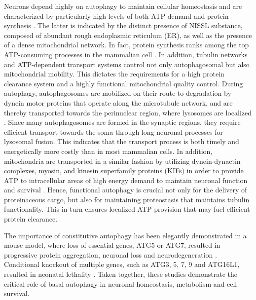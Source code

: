 Neurons depend highly on autophagy to maintain cellular homeostasis and are characterized by particularly high levels of both ATP demand and protein synthesis \citep{Meijer2009,Son2012}. The latter is indicated by the distinct presence of NISSL substance, composed of abundant rough endoplasmic reticulum (ER), as well as the presence of a dense mitochondrial network. In fact, protein synthesis ranks among the top ATP-consuming processes in the mammalian cell 
\citep{Buttgereit1995}. In addition, tubulin networks and ATP-dependent transport systems control not only autophagosomal but also mitochondrial mobility. This dictates the requirements for a high protein clearance system and a highly functional mitochondrial quality control. During autophagy, autophagosomes are mobilized on their route to degradation by dynein motor proteins that operate along the microtubule network, and are thereby transported towards the perinuclear region, where lysosomes are localized \citep{Fass2006,Jahreiss2008,Kimura2008}. Since many autophagosomes are formed in the synaptic regions, they require efficient transport towards the soma through long neuronal processes for lysosomal fusion. This indicates that the transport process is both timely and energetically more costly than in most mammalian cells. In addition, mitochondria are transported in a similar fashion by utilizing dynein-dynactin complexes, myosin, and kinesin superfamily proteins (KIFs) in order to provide ATP to intracellular areas of high energy demand to maintain neuronal function and survival \citep{Lin2015,Sheng2012}. Hence, functional autophagy is crucial not only for the delivery of proteinaceous cargo, but also for maintaining proteostasis that maintains tubulin functionality. This in turn ensures localized ATP provision that may fuel efficient protein clearance. 

The importance of constitutive autophagy has been elegantly demonstrated in a mouse model, where loss of essential genes, ATG5 or ATG7, resulted in progressive protein aggregation, neuronal loss and neurodegeneration \citep{Hara2006,Komatsu2006}. Conditional knockout of multiple genes, such as ATG3, 5, 7, 9 and ATG16L1, resulted in neonatal lethality \citep{Mizushima2010}. Taken together, these studies demonstrate the critical role of basal autophagy in neuronal homeostasis, metabolism and cell survival. 

